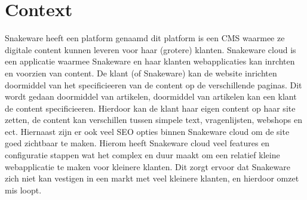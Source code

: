 \section{Context}
Snakeware heeft een platform genaamd  dit platform is een \gls{CMS} waarmee ze digitale content kunnen leveren voor haar (grotere) klanten.
Snakeware cloud is een applicatie waarmee Snakeware en haar klanten webapplicaties kan inrchten en voorzien van content.
\whitespace
De klant (of Snakeware) kan de website inrichten doormiddel van het specificieeren van de content op de verschillende paginas.
Dit wordt gedaan doormiddel van artikelen, doormiddel van artikelen kan een klant de content specificieeren.
Hierdoor kan de klant haar eigen content op haar site zetten, de content kan verschillen tussen simpele text, vragenlijsten, webshops en ect.
Hiernaast zijn er ook veel SEO opties binnen Snakeware cloud om de site goed zichtbaar te maken.
Hierom heeft Snakeware cloud veel features en configuratie stappen wat het complex en duur maakt om een relatief kleine webapplicatie te maken voor kleinere klanten.
\whitespace
Dit zorgt ervoor dat Snakeware zich niet kan vestigen in een markt met veel kleinere klanten,
en hierdoor omzet mis loopt.
